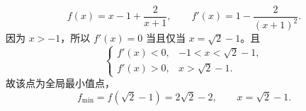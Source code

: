 \[
f(x)=x-1+\frac{2}{x+1},\qquad
f'(x)=1-\frac{2}{(x+1)^2}.
\]
因为 $x>-1$，所以 $f'(x)=0$ 当且仅当 $x=\sqrt2-1$。且
\[
\begin{cases}
f'(x)<0,&-1<x<\sqrt2-1,\\
f'(x)>0,&x>\sqrt2-1.
\end{cases}
\]
故该点为全局最小值点，
\[
\boxed{f_{\min}=f(\sqrt2-1)=2\sqrt2-2},\qquad
\boxed{x=\sqrt2-1}.
\]

